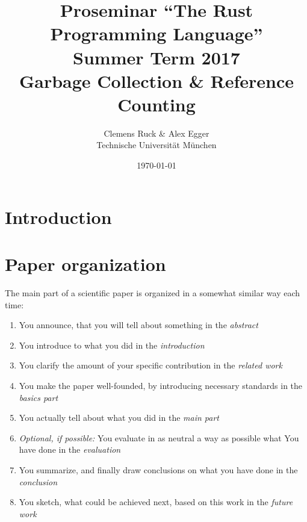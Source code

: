 \documentclass[twocolumn]{article}
\author{Clemens Ruck \& Alex Egger\\ Technische Universit\"at M\"unchen}
\title{Proseminar ``The Rust Programming Language'' \\
       Summer Term 2017 \\
       {\bf Garbage Collection \& Reference Counting}
}
\date{\today}
\begin{document}
\maketitle

\begin{abstract}
\end{abstract}

\section{Introduction}

\label{introduction}
\section{Paper organization}
The main part of a scientific paper is organized in a somewhat similar way
each time:
\begin{enumerate}
\item You announce, that you will tell about something in the \emph{abstract}
\item You introduce to what you did in the \emph{introduction}
\item You clarify the amount of your specific contribution in the \emph{related work}
\item You make the paper well-founded, by introducing necessary standards in the \emph{basics part}
\item You actually tell about what you did in the \emph{main part}
\item \emph{Optional, if possible:} You evaluate in as neutral a way as possible what You have done in the \emph{evaluation}
\item You summarize, and finally draw conclusions on what you have done in the \emph{conclusion}
\item You sketch, what could be achieved next, based on this work in the \emph{future work}
\end{enumerate}
\end{document}
